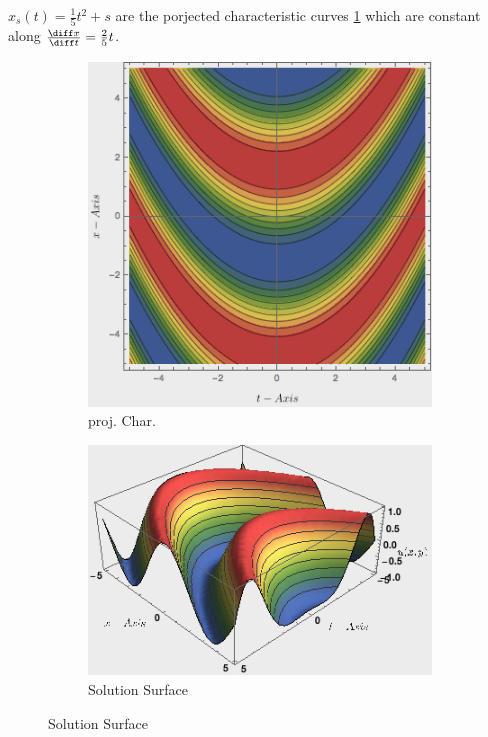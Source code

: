 \begin{notebox}[Note]
    $x_s(t)=\frac{1}{5}t^2+s$ are the porjected characteristic curves \cref{fig:projChar2p1} which are constant along $\frac{\diff x}{\diff t}=\frac{2}{5}t$.
                \begin{figure}[H]
                    \centering
                    \begin{subfigure}{.4\columnwidth}
                      \centering
                      \includegraphics[width=\linewidth]{figures/projChar2p1.png}
                      \caption{proj. Char.}
                      \label{fig:projChar2p1}
                    \end{subfigure}%
                    \begin{subfigure}{.6\columnwidth}
                      \centering\tabularnewline
                      \includegraphics[width=\linewidth]{figures/projChar2p2.png}
                      \caption{Solution Surface}
                      \label{fig:projChar2p2}
                    \end{subfigure}
                \end{figure}
\end{notebox}
